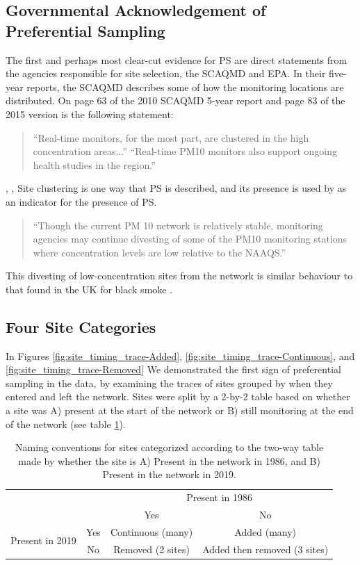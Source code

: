 \documentclass{article}
\begin{document}
\subsection{Governmental Acknowledgement of Preferential Sampling} \label{subsec:govPrefSamp}
The first and perhaps most clear-cut evidence for \ac{PS} are direct statements from the agencies responsible for site selection, the \ac{SCAQMD} and \ac{EPA}.  In their five-year reports, the \ac{SCAQMD} describes some of how the monitoring locations are distributed.  On page 63 of the 2010 \ac{SCAQMD} 5-year report and page 83 of the 2015 version is the following statement:
\begin{quote}
	``Real-time monitors, for the most part, are clustered in the high concentration areas...''  ``Real-time \ac{PM10} monitors also support ongoing health studies in the region.''    
\end{quote} \cite{CASCAQMD:2010}, \cite{CASCAQMD:2015}, \cite{AQMNP:2019}
Site clustering is one way that \ac{PS} is described, and its presence is used by \cite{watson2020} as an indicator for the presence of \ac{PS}. 

\begin{quote}
	``Though the current PM 10 network is relatively stable, monitoring agencies may  continue divesting of some of the PM10 monitoring stations where concentration levels are low relative to the NAAQS.''
\end{quote} \cite{EPA:IntegratedReview}
This divesting of low-concentration sites from the network is similar behaviour to that found in the UK for black smoke \citep{zidek2010monitoring}.

\subsection{Four Site Categories}\label{sec:4sitecategories}
In Figures \ref{fig:site_timing_trace-Added}, \ref{fig:site_timing_trace-Continuous}, and \ref{fig:site_timing_trace-Removed} We demonstrated the first sign of preferential sampling in the data, by examining the traces of sites grouped by when they entered and left the network.  Sites were split by a 2-by-2 table based on whether a site was A) present at the start of the network or B) still monitoring at the end of the network (see table \ref{tab:2X2_site_category}).

\begin{table}[ht]
	\centering
	\begin{tabular}{| c c | c c |}
		\hline
		\multirow{2}{*}{} & {} & \multicolumn{2}{c}{Present in 1986} \\
		& {} & Yes & No \\
		\hline 
		\multirow{2}{*}{Present in 2019} & Yes & Continuous (many) & Added (many) \\
		& No & Removed (2 sites) & Added then removed (3 sites)   \\
		\hline
	\end{tabular}
	\caption{Naming conventions for sites categorized according to the two-way table made by whether the site is A) Present in the network in 1986, and B) Present in the network in 2019.}
	\label{tab:2X2_site_category}
\end{table}
\end{document}

